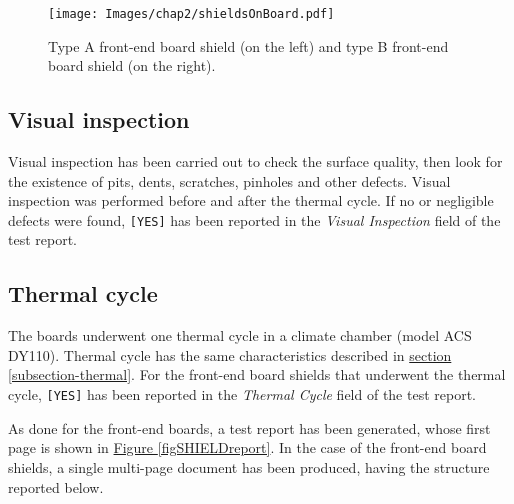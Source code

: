 \begin{figure}[h!]
    \centering
    \texttt{[image: Images/chap2/shieldsOnBoard.pdf]}
    \caption{Type A front-end board shield (on the left) and type B front-end board shield (on the right).}
    \label{figShieldsMounted}
\end{figure}

\subsection{Visual inspection}
Visual inspection has been carried out to check the surface quality, then look for the existence of pits, dents, scratches, pinholes and other defects. Visual inspection was performed before and after the thermal cycle. If no or negligible defects were found, \texttt{[YES]} has been reported in the \textit{Visual Inspection} field of the test report.

\subsection{Thermal cycle}
The boards underwent one thermal cycle in a climate chamber (model ACS DY110). Thermal cycle has the same characteristics described in \hyperref[subsection-thermal]{section \ref{subsection-thermal}}. For the front-end board shields that underwent the thermal cycle, \texttt{[YES]} has been reported in the \textit{Thermal Cycle} field of the test report.

\par
As done for the front-end boards, a test report has been generated, whose first page is shown in \hyperref[figSHIELDreport]{Figure \ref{figSHIELDreport}}. In the case of the front-end board shields, a single multi-page document has been produced, having the structure reported below.

\begin{table}[ht]
    \centering
    \def\arraystretch{1.3}
    \caption{Structure of the entry for the front-end board shields test report.}
    \label{tabSHIELDstruct}
\end{table}
